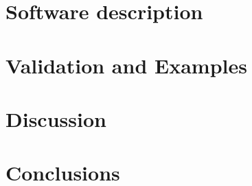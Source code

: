 \documentclass[preprint,12pt, a4paper]{elsarticle}
\begin{document}

\section{Software description}
\label{s:architecture}

%
%


\section{Validation and Examples}
\label{s:examples}



\section{Discussion}
\label{s:discussion}

%
%
%
%
%


\section{Conclusions}
\label{s:conclusions}
\end{document}
